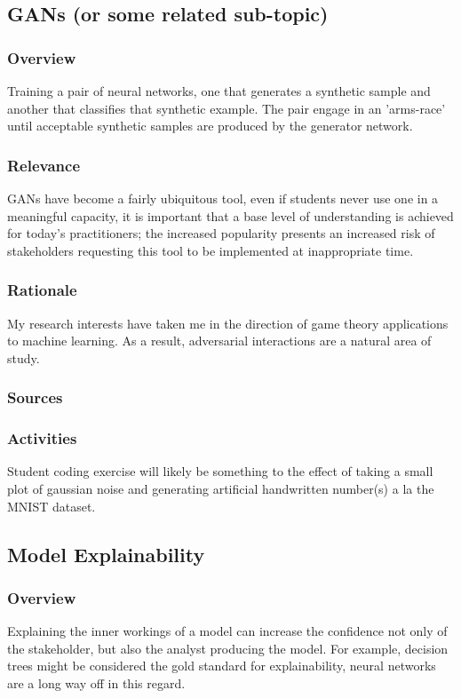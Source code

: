 \documentclass[12pt]{amsart}
\begin{document}
\subsection{GANs (or some related sub-topic)}
\subsubsection{Overview}
Training a pair of neural networks, one that generates a synthetic sample and another that classifies
that synthetic example. The pair engage in an 'arms-race' until acceptable synthetic samples are
produced by the generator network.

\subsubsection{Relevance}
GANs have become a fairly ubiquitous tool, even if students never use one in a meaningful capacity,
it is important that a base level of understanding is achieved for today's practitioners;
the increased popularity presents an increased risk of stakeholders requesting this tool to be
implemented at inappropriate time.

\subsubsection{Rationale}
My research interests have taken me in the direction of game theory applications to machine learning.
As a result, adversarial interactions are a natural area of study.

\subsubsection{Sources}

\subsubsection{Activities}
Student coding exercise will likely be something to the effect of taking a small plot of gaussian noise
and generating artificial handwritten number(s) a la the MNIST dataset.



\subsection{Model Explainability}
\subsubsection{Overview}
Explaining the inner workings of a model can increase the confidence not only of the stakeholder,
but also the analyst producing the model. For example, decision trees might be considered the gold standard
for explainability, neural networks are a long way off in this regard.
\end{document}
